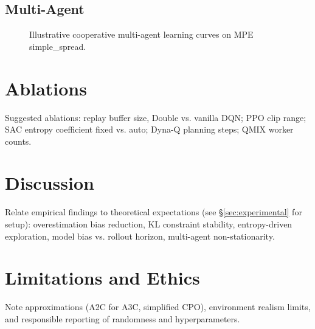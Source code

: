 \documentclass[12pt]{article}
\begin{document}
\subsection{Multi-Agent}
\begin{figure}[h]
    \centering
    \caption{Illustrative cooperative multi-agent learning curves on MPE simple\_spread.}
\end{figure}


\section{Ablations}
Suggested ablations: replay buffer size, Double vs. vanilla DQN; PPO clip range; SAC entropy coefficient fixed vs. auto; Dyna-Q planning steps; QMIX worker counts.

\section{Discussion}
Relate empirical findings to theoretical expectations (see \S\ref{sec:experimental} for setup): overestimation bias reduction, KL constraint stability, entropy-driven exploration, model bias vs. rollout horizon, multi-agent non-stationarity.

\section{Limitations and Ethics}
Note approximations (A2C for A3C, simplified CPO), environment realism limits, and responsible reporting of randomness and hyperparameters.
\end{document}
